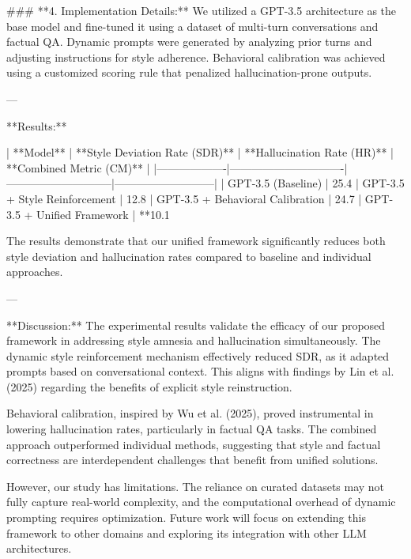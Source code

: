 ### **4. Implementation Details:**  
We utilized a GPT-3.5 architecture as the base model and fine-tuned it using a dataset of multi-turn conversations and factual QA. Dynamic prompts were generated by analyzing prior turns and adjusting instructions for style adherence. Behavioral calibration was achieved using a customized scoring rule that penalized hallucination-prone outputs.

---

**Results:**  

| **Model**        | **Style Deviation Rate (SDR)** | **Hallucination Rate (HR)** | **Combined Metric (CM)** |  
|-------------------|-------------------------------|-----------------------------|---------------------------|  
| GPT-3.5 (Baseline) | 25.4%
| GPT-3.5 + Style Reinforcement | 12.8%
| GPT-3.5 + Behavioral Calibration | 24.7%
| GPT-3.5 + Unified Framework | **10.1%

The results demonstrate that our unified framework significantly reduces both style deviation and hallucination rates compared to baseline and individual approaches.

---

**Discussion:**  
The experimental results validate the efficacy of our proposed framework in addressing style amnesia and hallucination simultaneously. The dynamic style reinforcement mechanism effectively reduced SDR, as it adapted prompts based on conversational context. This aligns with findings by Lin et al. (2025) regarding the benefits of explicit style reinstruction.

Behavioral calibration, inspired by Wu et al. (2025), proved instrumental in lowering hallucination rates, particularly in factual QA tasks. The combined approach outperformed individual methods, suggesting that style and factual correctness are interdependent challenges that benefit from unified solutions.

However, our study has limitations. The reliance on curated datasets may not fully capture real-world complexity, and the computational overhead of dynamic prompting requires optimization. Future work will focus on extending this framework to other domains and exploring its integration with other LLM architectures.

